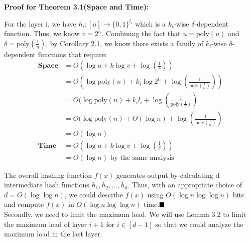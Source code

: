 \documentclass[a4paper, english]{paper}
\begin{document}
	\noindent\textbf{Proof for Theorem 3.1(Space and Time):} \par
	For the layer i, we have $h_i:[u]\rightarrow\{0,1\}^{l_i}$ which is a $k_i$-wise $\delta$-dependent function. Thus, we know $v = 2^{l_i}$. Combining the fact that $u = \text{poly}(u)$ and $\delta=\text{poly}(\frac1n)$, by Corollary 2.1, we know there exists a family of $k_i$-wise $\delta$-dependent functions that require:
\begin{align*}
\textbf{Space} &= O(\log u+k\log v+\log(\frac1\delta))\\
&= O(\log \text{poly}(n) + k_i\log 2^{l_i}+\log(\frac1{\text{poly}(\frac1n)}))\\
&= O(\log \text{poly}(n) + k_il_i+\log(\frac1{\text{poly}(\frac1n)})\\
&= O(\log \text{poly}(n) + \Theta(\log n)+\log(\frac1{\text{poly}(\frac1n)})\\
&= O(\log n)\\
\textbf{Time} &= O(\log u+k\log v+\log(\frac1\delta))\\
&=  O(\log n)\text{ by the same analysis}
\end{align*}\par
 The overall hashing function $f(x)$ generates output by calculating d intermediate hash functions $h_1,h_2,...,h_d$. Thus, with an appropriate choice of $d= O(\log\log n)$, we could describe $f(x)$ using $O(\log n\log\log n)$ bits and compute $f(x)$ in $O(\log n\log\log n)$ time.$\hfill\blacksquare$\\

	Secondly, we need to limit the maximum load. We will use Lemma 3.2 to limit the maximum load of layer $i+1$ for $i\in[d-1]$ so that we could analyze the maximum load in the last layer. \\
	
\end{document}
